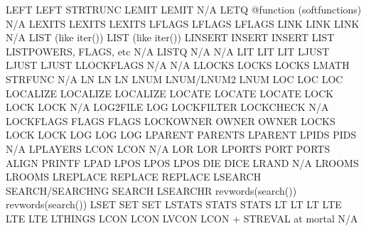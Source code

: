 \documentclass[letterpaper,10pt,english]{sphinxmanual}
\begin{document}
\begin{description}
LEFT                    LEFT                         STRTRUNC
LEMIT                   LEMIT                        N/A
LETQ                    @function (softfunctions)    N/A
LEXITS                  LEXITS                       LEXITS
LFLAGS                  LFLAGS                       LFLAGS
LINK                    LINK                         LINK
N/A                     LIST (like iter())           LIST (like iter())
LINSERT                 INSERT                       INSERT
LIST                    LISTPOWERS, FLAGS, etc       N/A
LISTQ                   N/A                          N/A
LIT                     LIT                          LIT
LJUST                   LJUST                        LJUST
LLOCKFLAGS              N/A                          N/A
LLOCKS                  LOCKS                        LOCKS
LMATH                   STRFUNC                      N/A
LN                      LN                           LN
LNUM                    LNUM/LNUM2                   LNUM
LOC                     LOC                          LOC
LOCALIZE                LOCALIZE                     LOCALIZE
LOCATE                  LOCATE                       LOCATE
LOCK                    LOCK                         LOCK
N/A                     LOG2FILE                     LOG
LOCKFILTER              LOCKCHECK                    N/A
LOCKFLAGS               FLAGS                        FLAGS
LOCKOWNER               OWNER                        OWNER
LOCKS                   LOCK                         LOCK
LOG                     LOG                          LOG
LPARENT                 PARENTS                      LPARENT
LPIDS                   PIDS                         N/A
LPLAYERS                LCON                         LCON
N/A                     LOR                          LOR
LPORTS                  PORT                         PORTS
ALIGN                   PRINTF                       LPAD
LPOS                    LPOS                         LPOS
DIE                     DICE                         LRAND
N/A                     LROOMS                       LROOMS
LREPLACE                REPLACE                      REPLACE
LSEARCH                 SEARCH/SEARCHNG              SEARCH
LSEARCHR                revwords(search())           revwords(search())
LSET                    SET                          SET
LSTATS                  STATS                        STATS
LT                      LT                           LT
LTE                     LTE                          LTE
LTHINGS                 LCON                         LCON
LVCON                   LCON + STREVAL at mortal     N/A

\end{description}
\end{document}
